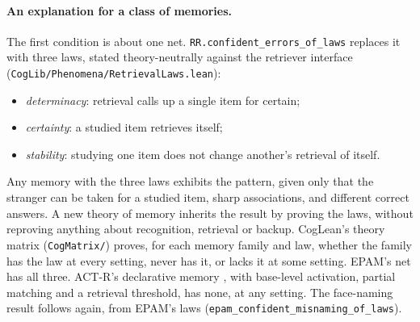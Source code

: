 \documentclass[11pt]{article}
\newcommand{\code}[1]{\texttt{#1}}
\newcommand{\lean}[1]{\texttt{#1}}
\begin{document}
\paragraph{An explanation for a class of memories.} The first condition is about one net. \lean{RR.confident\_errors\_of\_laws} replaces it with three laws, stated theory-neutrally against the retriever interface (\code{CogLib/Phenomena/RetrievalLaws.lean}):
\begin{itemize}
  \item \emph{determinacy}: retrieval calls up a single item for certain;
  \item \emph{certainty}: a studied item retrieves itself;
  \item \emph{stability}: studying one item does not change another's retrieval of itself.
\end{itemize}
Any memory with the three laws exhibits the pattern, given only that the stranger can be taken for a studied item, sharp associations, and different correct answers. A new theory of memory inherits the result by proving the laws, without reproving anything about recognition, retrieval or backup. CogLean's theory matrix (\code{CogMatrix/}) proves, for each memory family and law, whether the family has the law at every setting, never has it, or lacks it at some setting. EPAM's net has all three. ACT-R's declarative memory \citep{anderson2007}, with base-level activation, partial matching and a retrieval threshold, has none, at any setting. The face-naming result follows again, from EPAM's laws (\lean{epam\_confident\_misnaming\_of\_laws}).
\end{document}
